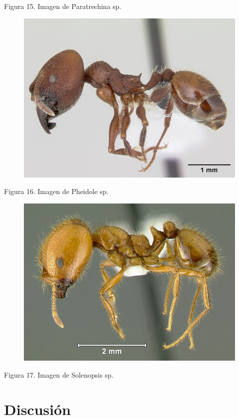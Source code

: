 \documentclass[11pt,]{article}
\begin{document}
Figura 15. Imagen de Paratrechina sp.

\begin{figure}
\centering
\includegraphics{pheidole.jpg}
\caption{}
\end{figure}

Figura 16. Imagen de Pheidole sp.

\begin{figure}
\centering
\includegraphics{solenopsis.jpg}
\caption{}
\end{figure}

Figura 17. Imagen de Solenopsis sp.

\section{Discusión}\label{discusiuxf3n}
\end{document}
